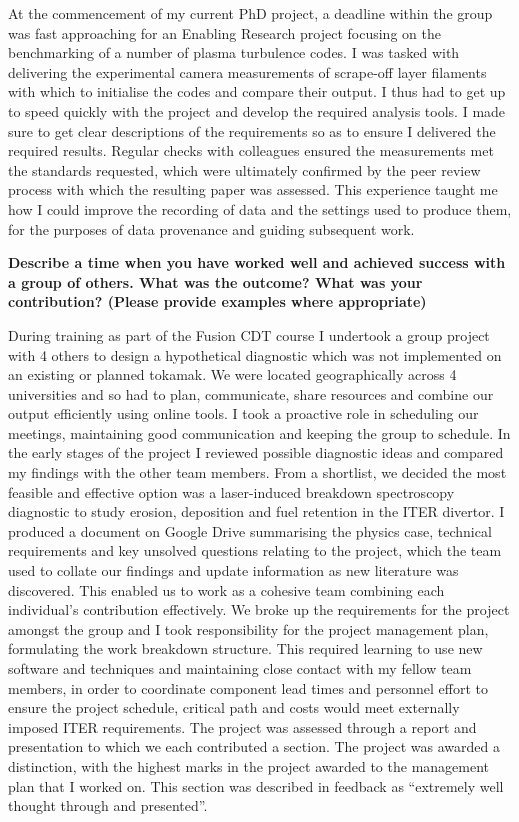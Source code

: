 \documentclass[11pt,a4paper,sans]{moderncv}        %
\begin{document}
At the commencement of my current PhD project, a deadline within the group was fast approaching for an Enabling Research project focusing on the benchmarking of a number of plasma turbulence codes. I was tasked with delivering the experimental camera measurements of scrape-off layer filaments with which to initialise the codes and compare their output. I thus had to get up to speed quickly with the project and develop the required analysis tools. I made sure to get clear descriptions of the requirements so as to ensure I delivered the required results. Regular checks with colleagues ensured the measurements met the standards requested, which were ultimately confirmed by the peer review process with which the resulting paper was assessed. This experience taught me how I could improve the recording of data and the settings used to produce them, for the purposes of data provenance and guiding subsequent work.


\textbf{Describe a time when you have worked well and achieved success with a group of others. What was the outcome? What was your contribution? (Please provide examples where appropriate) }

During training as part of the Fusion CDT course I undertook a group project with 4 others to design a hypothetical diagnostic which was not implemented on an existing or planned tokamak. We were located geographically across 4 universities and so had to plan, communicate, share resources and combine our output efficiently using online tools.  I took a proactive role in scheduling our meetings, maintaining good communication and keeping the group to schedule. In the early stages of the project I reviewed possible diagnostic ideas and compared my findings with the other team members.  From a shortlist, we decided the most feasible and effective option was a laser-induced breakdown spectroscopy diagnostic to study erosion, deposition and fuel retention in the ITER divertor. I produced a document on Google Drive summarising the physics case, technical requirements and key unsolved questions relating to the project, which the team used to collate our findings and update information as new literature was discovered. This enabled us to work as a cohesive team combining each individual's contribution effectively. We broke up the requirements for the project amongst the group and I took responsibility for the project management plan, formulating the work breakdown structure. This required learning to use new software and techniques and maintaining close contact with my fellow team members, in order to coordinate component lead times and personnel effort to ensure the project schedule, critical path and costs would meet externally imposed ITER requirements. The project was assessed through a report and presentation to which we each contributed a section. The project was awarded a distinction, with the highest marks in the project awarded to the management plan that I worked on. This section was described in feedback as ``extremely     well     thought     through     and     presented''.
\end{document}
